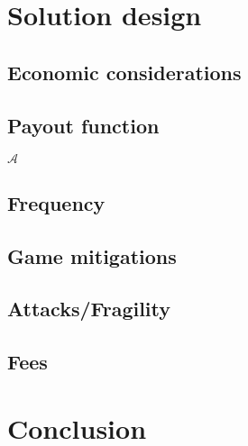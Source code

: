 \documentclass[11pt,a4paper]{article}
\begin{document}
\pagebreak

\section{Solution design}

\subsection{Economic considerations}

\subsection{Payout function}
$\mathcal{A}$ 

\subsection{Frequency}

\subsection{Game mitigations}

\subsection{Attacks/Fragility}

\subsection{Fees}

\pagebreak

\section{Conclusion}

\pagebreak

\printglossaries
\end{document}
